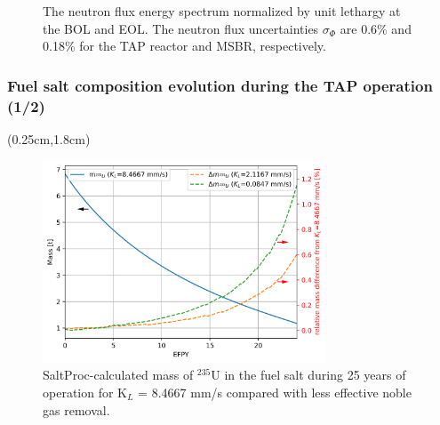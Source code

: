 \begin{frame}
\begin{textblock*}{12.6cm}
\begin{figure}[htp!]
\begin{overprint}
		\end{overprint}
		\caption{The neutron flux energy spectrum normalized by unit lethargy 
		at the BOL and EOL. The neutron flux uncertainties $\sigma_{\Phi}$ are 
		0.6\% and 0.18\% for the \gls{TAP} reactor and \gls{MSBR}, 
		respectively.}
	\end{figure}
\end{textblock*}
\end{frame}


\begin{frame}
\frametitle{Fuel salt composition evolution during the TAP operation (1/2)}
\begin{textblock*}{12.25cm}(0.25cm,1.8cm) %
	\begin{figure}[htp!] %
		\centering
		\includegraphics[width=0.75\textwidth]{../dissertation/figures/ch4/eps/u235.png}
			\vspace{-2mm}
		\caption{SaltProc-calculated mass of $^{235}$U in the fuel salt during 
		25 years of operation
for K$_L$ = 8.4667 mm/s compared with less 
		effective noble gas removal.}
	\end{figure}
\end{textblock*}
\end{frame}

